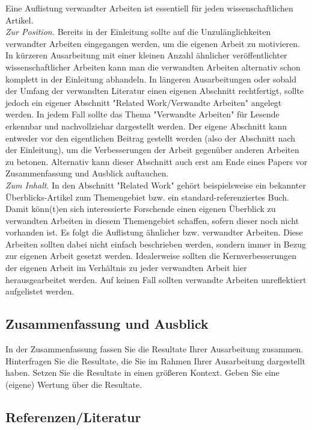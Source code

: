 Eine Auflistung verwandter Arbeiten ist essentiell für jeden wissenschaftlichen Artikel.\\

\noindent
\emph{Zur Position.}
Bereits in der Einleitung sollte auf die Unzulänglichkeiten verwandter Arbeiten eingegangen werden,
um die eigenen Arbeit zu motivieren.
In kürzeren Ausarbeitung mit einer kleinen Anzahl ähnlicher veröffentlichter wissenschaftlicher
Arbeiten kann man die verwandten Arbeiten alternativ schon komplett in der Einleitung abhandeln.
In längeren Ausarbeitungen oder sobald der Umfang der verwandten Literatur einen eigenen Abschnitt
rechtfertigt, sollte jedoch ein eigener Abschnitt "Related Work/Verwandte Arbeiten" angelegt werden.
In jedem Fall sollte das Thema "Verwandte Arbeiten" für Lesende erkennbar und nachvollziehar
dargestellt werden.
Der eigene Abschnitt kann entweder vor den eigentlichen Beitrag gestellt werden (also der Abschnitt
nach der Einleitung), um die Verbesserungen der Arbeit gegenüber anderen Arbeiten zu betonen.
Alternativ kann dieser Abschnitt auch erst am Ende eines Papers vor Zusammenfassung und Ausblick
auftauchen.\\

\noindent
\emph{Zum Inhalt}.
In den Abschnitt "Related Work" gehört beispielsweise ein bekannter Überblicks-Artikel zum
Themengebiet bzw. ein standard-referenziertes Buch.
Damit könn(t)en sich interessierte Forschende einen eigenen Überblick zu verwandten Arbeiten in
diesem Themengebiet schaffen, sofern dieser noch nicht vorhanden ist.
Es folgt die Auflistung ähnlicher bzw. verwandter Arbeiten.
Diese Arbeiten sollten dabei nicht einfach beschrieben werden, sondern immer in Bezug zur eigenen
Arbeit gesetzt werden.
Idealerweise sollten die Kernverbesserungen der eigenen Arbeit im Verhältnis zu jeder verwandten
Arbeit hier herausgearbeitet werden.
Auf keinen Fall sollten verwandte Arbeiten unreflektiert aufgelistet werden.

\subsection{Zusammenfassung und Ausblick}
In der Zusammenfassung fassen Sie die Resultate Ihrer Ausarbeitung zusammen. Hinterfragen Sie die
Resultate, die Sie im Rahmen Ihrer Ausarbeitung dargestellt haben. Setzen Sie die Resultate in einen
größeren Kontext. Geben Sie eine (eigene) Wertung über die Resultate.

\subsection{Referenzen/Literatur} \label{subsec:referenzen}

